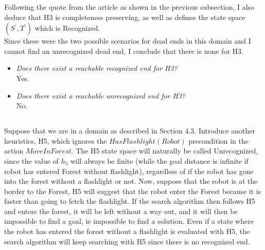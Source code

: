 \documentclass[a4paper, 11pt]{article}
\begin{document}
Following the quote from the article as shown in the previous subsection, I also deduce that H3 is completeness preserving, as well as defines the state space $(S^\prime, T^\prime)$ which is Recognized. \\

Since these were the two possible scenarios for dead ends in this domain and I cannot find an unrecognized dead end, I conclude that there is none for H3. 

\begin{itemize}
    \item \textit{Does there exist a reachable recognized end for H3?} \\
    Yes. 
    \item \textit{Does there exist a reachable unrecognized end for H3?} \\
    No.
\end{itemize}

\subsection{}

Suppose that we are in a domain as described in Section 4.3. Introduce another heuristics, H5, which ignores the $HasFlashlight(Robot)$ precondition in the action  $MoveInForest$. The H5 state space will naturally be called Unrecognized, since the value of $h_5$ will always be finite (while the goal distance is infinite if robot has entered Forest without flashlight), regardless of if the robot has gone into the forest without a flashlight or not. Now, suppose that the robot is at the border  to the Forest, H5 will suggest that the robot enter the Forest because it is faster than going to fetch the flashlight. If the search algorithm then follows H5 and enters the forest, it will be left without a way out, and it will then be impossible to find a goal, ie impossible to find a solution. Even if a state where the robot has entered the forest without a flashlight is evaluated with H5, the search algorithm will keep searching with H5 since there is no recognized end. 


    
\end{document}
